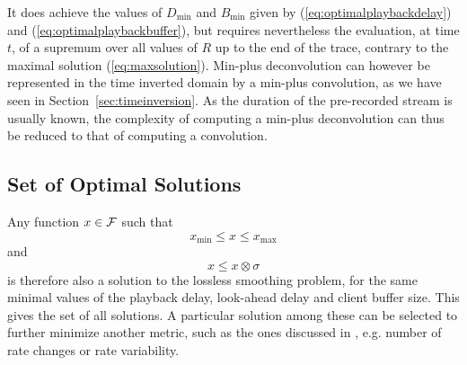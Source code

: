 It does achieve the values of $D_{\min}$ and $B_{\min}$ given by (\ref{eq:optimalplaybackdelay})
and (\ref{eq:optimalplaybackbuffer}), but requires nevertheless the evaluation, at time $t$, of a supremum
over all values of $R$ up to the end of the trace, contrary to the maximal solution (\ref{eq:maxsolution}).
Min-plus deconvolution can however be represented in the time inverted domain by a min-plus convolution,
as we have seen in Section~\ref{sec:timeinversion}. As the duration of the pre-recorded stream is usually
known, the complexity of computing a min-plus deconvolution can thus be reduced to that of computing a convolution.

\subsection{Set of Optimal Solutions}

Any function $x \in \mathcal F$ such that
$$ x_{\min} \leq x \leq x_{\max} $$
and
$$ x \leq x \otimes \sigma $$
is therefore also a solution to the lossless smoothing problem, for the same minimal
values of the playback delay, look-ahead delay and client buffer size. This gives the set of all solutions.
A particular solution among these can be selected to further minimize another metric,
such as the ones discussed in \cite{FengRexford99}, e.g. number of rate changes or rate variability.




